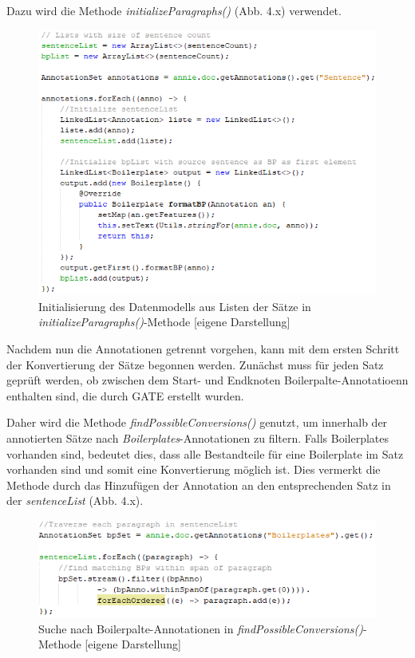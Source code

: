 \documentclass[12pt]{report}
\begin{document}
Dazu wird die Methode \textit{initializeParagraphs()} (Abb. 4.x) verwendet.

\begin{figure}[h!]
\begin{center}
\includegraphics[scale=1]{Bilder/BoilerplateHandler-initializeParagraphs.png}
\caption{Initialisierung des Datenmodells aus Listen der Sätze in \textit{initializeParagraphs()}-Methode [eigene Darstellung]}
\end{center}
\end{figure}

Nachdem nun die Annotationen getrennt vorgehen, kann mit dem ersten Schritt der Konvertierung der Sätze begonnen werden. Zunächst muss für jeden Satz geprüft werden, ob zwischen dem Start- und Endknoten Boilerpalte-Annotatioenn enthalten sind, die durch GATE erstellt wurden. 

Daher wird die Methode \textit{findPossibleConversions()} genutzt, um innerhalb der annotierten Sätze nach \textit{Boilerplates}-Annotationen zu filtern. Falls Boilerplates vorhanden sind, bedeutet dies, dass alle Bestandteile für eine Boilerplate im Satz vorhanden sind und somit eine Konvertierung möglich ist. Dies vermerkt die Methode durch das Hinzufügen der Annotation an den entsprechenden Satz in der \textit{sentenceList} (Abb. 4.x).

\begin{figure}[h!]
\begin{center}
\includegraphics[scale=1]{Bilder/BoilerplateHandler-findPossibleConversions.png}
\caption{Suche nach Boilerpalte-Annotationen in \textit{findPossibleConversions()}-Methode [eigene Darstellung]}
\end{center}
\end{figure}
\end{document}
